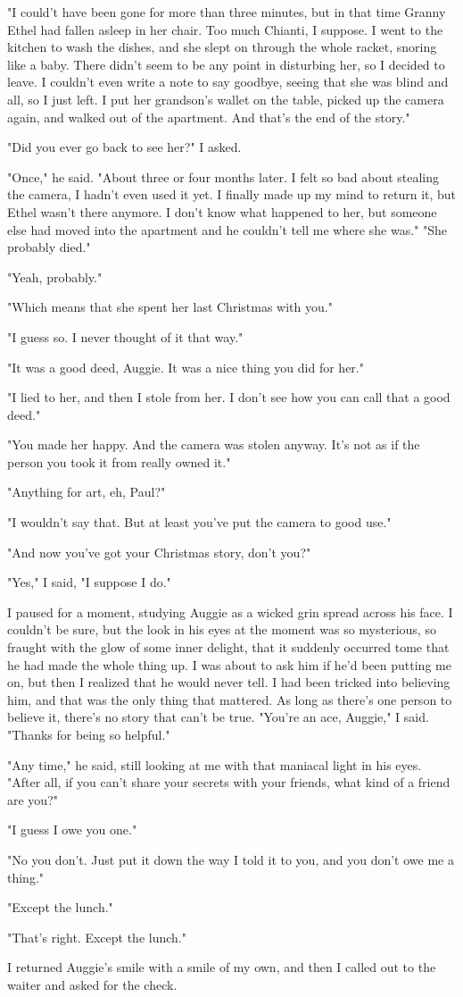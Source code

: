 \documentclass[10pt,a4paper]{article}
\begin{document}
"I could't have been gone for more than three minutes, but in that time Granny Ethel had fallen asleep in her chair. Too much Chianti, I suppose. I went to the kitchen to wash the dishes, and she slept on through the whole racket, snoring like a baby. There didn't seem to be any point in disturbing her, so I decided to leave. I couldn't even write a note to say goodbye, seeing that she was blind and all, so I just left. I put her grandson's wallet on the table, picked up the camera again, and walked out of the apartment. And that's the end of the story."

"Did you ever go back to see her?" I asked.

"Once," he said. "About three or four months later. I felt so bad about stealing the camera, I hadn't even used it yet. I finally made up my mind to return it, but Ethel wasn't there anymore. I don't know what happened to her, but someone else had moved into the apartment and he couldn't tell me where she was."
"She probably died."

"Yeah, probably."

"Which means that she spent her last Christmas with you."

"I guess so. I never thought of it that way."

"It was a good deed, Auggie. It was a nice thing you did for her."

"I lied to her, and then I stole from her. I don't see how you can call that a good deed."

"You made her happy. And the camera was stolen anyway. It's not as if the person you took it from really owned it."

"Anything for art, eh, Paul?"

"I wouldn't say that. But at least you've put the camera to good use."

"And now you've got your Christmas story, don't you?"

"Yes," I said, "I suppose I do."

I paused for a moment, studying Auggie as a wicked grin spread across his face. I couldn't be sure, but the look in his eyes at the moment was so mysterious, so fraught with the glow of some inner delight, that it suddenly occurred tome that he had made the whole thing up. I was about to ask him if he'd been putting me on, but then I realized that he would never tell. I had been tricked into believing him, and that was the only thing that mattered. As long as there's one person to believe it, there's no story that can't be true.
"You're an ace, Auggie," I said. "Thanks for being so helpful."

"Any time," he said, still looking at me with that maniacal light in his eyes. "After all, if you can't share your secrets with your friends, what kind of a friend are you?"

"I guess I owe you one."

"No you don't. Just put it down the way I told it to you, and you don't owe me a thing."

"Except the lunch."

"That's right. Except the lunch."

I returned Auggie's smile with a smile of my own, and then I called out to the waiter and asked for the check.
\end{document}
